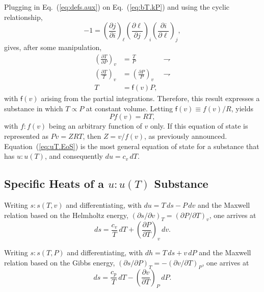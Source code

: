 \documentclass[fleqn,11pt]{SelfArx}
\newcommand{\parxyz}[3]{\left(\frac{\partial {{#1}}}{\partial {{#2}}}\right)_{\!\!\!{#3}}}
\newcommand{\inlxyz}[3]{({\partial {{#1}}}/{\partial {{#2}}})_{{#3}}}
\begin{document}
    Plugging  in  Eq.~(\ref{eq:defs.aux})  on  Eq.~(\ref{eq:bT.kP})   and   using   the   cyclic
    relationship,
    \begin{equation}
        -1 = \parxyz ji\ell \parxyz\ell ji \parxyz i\ell j,
        \label{eq:cyclic}
    \end{equation}
    \noindent gives, after some manipulation,
    \begin{align}
        \parxyz TPv & = \frac{T}{P} & \rightharpoondown \\
        \left(\frac{\partial T}{T}\right)_{\!\!\!v} & =
            \left(\frac{\partial P}{P}\right)_{\!\!\!v} & \rightharpoondown \\
        T & = \mathsf{f}(v)P,
        \label{eq:uT.TPv}
    \end{align}
    \noindent with $\mathsf{f}(v)$ arising from the partial integrations. Therefore, this result
    expresses a substance in which $T \propto P$  at  constant  volume.  Letting  $\mathsf{f}(v)
    \equiv f(v)/R$, yields
    \begin{equation}
        Pf(v) = RT,
        \label{eq:uT.EoS}
    \end{equation}
    \noindent with $f\!:\!f(v)$ being an arbitrary function of $v$ only.  If  this  equation  of
    state  is  represented  as  $Pv  =  ZRT$,  then  $Z  =  v/f(v)$,  as  previously  announced.
    Equation~(\ref{eq:uT.EoS}) is the most general equation of state for a  substance  that  has
    $u\!:\!u(T)$, and consequently $du = c_v\,dT$.

    \subsection{Specific Heats of a $u\!:\!u(T)$ Substance}\label{sec:specific.heats}

    Writing $s\!:\!s(T, v)$ and differentiating, with $du =  T\,ds  -  P\,dv$  and  the  Maxwell
    relation based on the Helmholtz energy, $\inlxyz svT = \inlxyz PTv$, one arrives at
    \begin{equation}
        ds = \frac{c_v}{T}\,dT + \parxyz PTv\,dv.
        \label{eq:ds.Tv}
    \end{equation}

    Writing $s\!:\!s(T, P)$ and differentiating, with $dh =  T\,ds  +  v\,dP$  and  the  Maxwell
    relation based on the Gibbs energy, $\inlxyz sPT = -\inlxyz vTP$, one arrives at
    \begin{equation}
        ds = \frac{c_p}{T}\,dT - \parxyz vTP\,dP.
        \label{eq:ds.TP}
    \end{equation}
\end{document}
